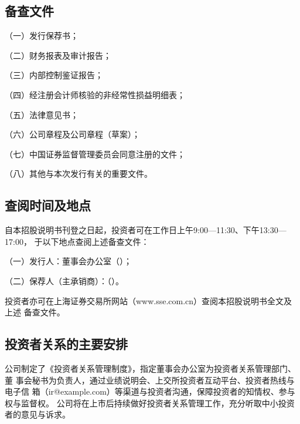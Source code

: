 
\subsection{备查文件}

（一）发行保荐书；

（二）财务报表及审计报告；

（三）内部控制鉴证报告；

（四）经注册会计师核验的非经常性损益明细表；

（五）法律意见书；

（六）公司章程及公司章程（草案）；

（七）中国证券监督管理委员会同意注册的文件；

（八）其他与本次发行有关的重要文件。

\subsection{查阅时间及地点}

自本招股说明书刊登之日起，投资者可在工作日上午9:00—11:30、下午13:30—17:00，
于以下地点查阅上述备查文件：

（一）发行人：\gsCompany 董事会办公室（\gsRegAddr）；

（二）保荐人（主承销商）：\gsSponsor（\gsSponsorAddr）。

投资者亦可在上海证券交易所网站（www.sse.com.cn）查阅本招股说明书全文及上述
备查文件。


\subsection{投资者关系的主要安排}

公司制定了《投资者关系管理制度》，指定董事会办公室为投资者关系管理部门、董
事会秘书为负责人，通过业绩说明会、上交所投资者互动平台、投资者热线与电子信
箱（ir@example.com）等渠道与投资者沟通，保障投资者的知情权、参与权与监督权。
公司将在上市后持续做好投资者关系管理工作，充分听取中小投资者的意见与诉求。

